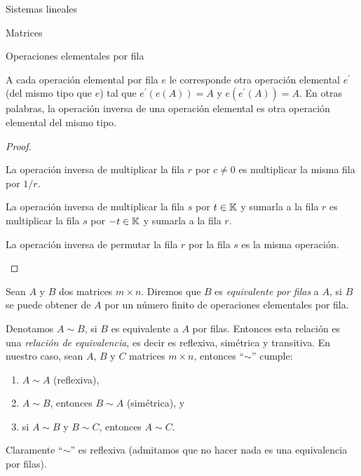 \begin{chapter}{Sistemas lineales}
\begin{section}{Matrices}
\begin{subsection}{Operaciones elementales por fila}
                \begin{teorema}\label{op-elem}
                    A cada operación elemental por fila $e$ le corresponde otra operación elemental $e^\prime$ (del mismo tipo que $e$) tal que $e^\prime(e(A)) = A$ y $e(e^\prime(A)) = A$. En otras palabras, la operación inversa de una operación elemental es otra operación elemental del mismo tipo.  
                \end{teorema}
                \begin{proof} \
                    \begin{enumelem}
                        \item La operación inversa de multiplicar la fila $r$ por $c\not=0$ es multiplicar la misma fila por $1/r$.
                        \item La operación inversa de multiplicar la fila $s$ por  $t \in \mathbb K$ y sumarla a la fila $r$ es multiplicar  la fila $s$ por  $-t \in \mathbb K$ y sumarla a la fila $r$.
                        \item La operación inversa de permutar la fila $r$ por la fila $s$ es la misma operación.
                    \end{enumelem}
                \end{proof}
                
                \begin{definicion} 
                    Sean $A$ y $B$ dos matrices $m \times n$. Diremos que $B$ es \textit{equivalente por filas} a $A$, si $B$ se puede obtener de $A$ por un número finito de operaciones elementales por fila. 
                \end{definicion}
            

                \begin{observacion*} Denotamos $A \sim B$, si $B$ es equivalente a $A$ por filas. Entonces esta relación es una \textit{relación de equivalencia}, es decir es reflexiva, simétrica y transitiva. En  nuestro caso, sean $A$, $B$ y $C$ matrices $m \times n$, entonces ``$\sim$'' cumple: 
                    \begin{enumerate}
                        \item  $A \sim A$ (reflexiva), 
                        \item $A \sim B$, entonces $B \sim A$ (simétrica), y
                        \item si $A \sim B$ y $B \sim C$, entonces $A \sim C$.   
                    \end{enumerate}
                    Claramente ``$\sim$'' es reflexiva (admitamos que no hacer nada es una equivalencia por filas). 
                    

\end{observacion*}
\end{subsection}
\end{section}
\end{chapter}

